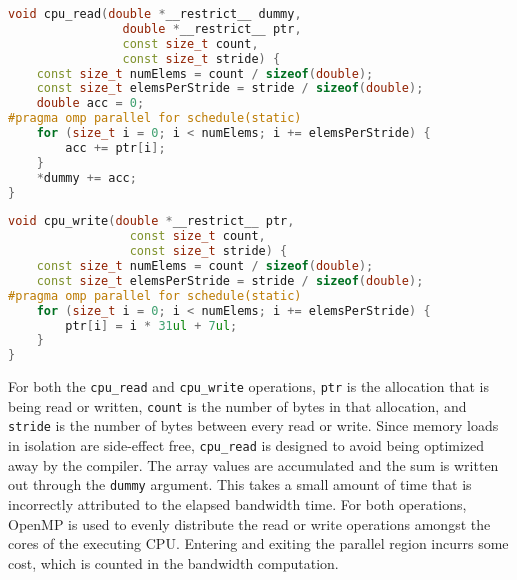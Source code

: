 \begin{lstlisting}[language=C++, caption=CPU-CPU Read Function, label=lst:explicit-cpu-cpu-cpuread]
void cpu_read(double *__restrict__ dummy,
                double *__restrict__ ptr,
                const size_t count,
                const size_t stride) {
    const size_t numElems = count / sizeof(double);
    const size_t elemsPerStride = stride / sizeof(double);
    double acc = 0;
#pragma omp parallel for schedule(static)
    for (size_t i = 0; i < numElems; i += elemsPerStride) {
        acc += ptr[i];
    }
    *dummy += acc;
}
\end{lstlisting}


\begin{lstlisting}[language=C++, caption=CPU-CPU Write Function, label=lst:explicit-cpu-cpu-cpuwrite]
void cpu_write(double *__restrict__ ptr, 
                 const size_t count, 
                 const size_t stride) {
    const size_t numElems = count / sizeof(double);
    const size_t elemsPerStride = stride / sizeof(double);
#pragma omp parallel for schedule(static)
    for (size_t i = 0; i < numElems; i += elemsPerStride) {
        ptr[i] = i * 31ul + 7ul;
    }
}
\end{lstlisting}

For both the \texttt{cpu\_read} and \texttt{cpu\_write} operations, \texttt{ptr} is the allocation that is being read or written,
\texttt{count} is the number of bytes in that allocation, and \texttt{stride} is the number of bytes between every read or write.
Since memory loads in isolation are side-effect free, \texttt{cpu\_read} is designed to avoid being optimized away by the compiler.
The array values are accumulated and the sum is written out through the \texttt{dummy} argument.
This takes a small amount of time that is incorrectly attributed to the elapsed bandwidth time.
For both operations, OpenMP is used to evenly distribute the read or write operations amongst the cores of the executing CPU.
Entering and exiting the parallel region incurrs some cost, which is counted in the bandwidth computation.

